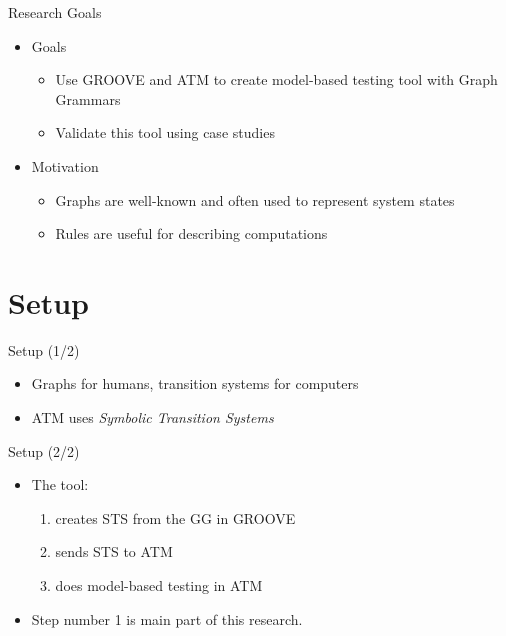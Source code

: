 \documentclass{FMTslides}
\begin{document}
\begin{frame}{Research Goals}
\begin{itemize}
  \item Goals
  \begin{itemize}
    \item Use GROOVE and ATM to create model-based testing tool with Graph Grammars
    \item Validate this tool using case studies
  \end{itemize}
  \item Motivation
  \begin{itemize}
    \item Graphs are well-known and often used to represent system states
    \item Rules are useful for describing computations
  \end{itemize}
\end{itemize}
\end{frame}

\makecontentsslide

\section[Setup]{Setup}

\begin{frame}{Setup (1/2)}
\begin{itemize}
  \item Graphs for humans, transition systems for computers
  \item ATM uses \textit{Symbolic Transition Systems}
\end{itemize}
\begin{figure}

\end{figure}
\end{frame}

\begin{frame}{Setup (2/2)}
\begin{itemize}
  \item The tool:
  \begin{enumerate}
    \item creates STS from the GG in GROOVE
    \item sends STS to ATM
    \item does model-based testing in ATM
  \end{enumerate}
  \item Step number 1 is main part of this research.
\end{itemize}
\end{frame}
\end{document}
